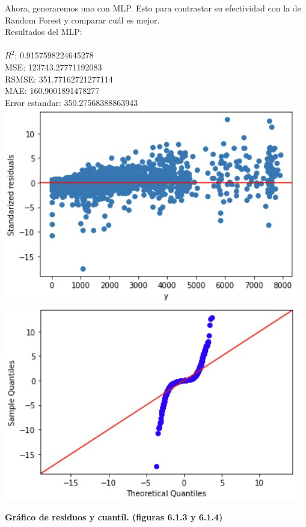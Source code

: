 \documentclass{article}
\begin{document}
            Ahora, generaremos uno con MLP. Esto para contrastar su efectividad con la de Random Forest y comparar cuál es mejor.\\
            
            Resultados del MLP:\\
                    \\  
                        $R^2$:  0.9157598224645278 \\
                        MSE:  123743.27771192083 \\
                        RSMSE:  351.77162721277114 \\
                        MAE:  160.9001891478277 \\
                        Error estandar:  350.27568388863943 \\
                
                
                        \includegraphics[scale=0.6]{images/MLP_After_DS.jpg} 
                        \includegraphics[scale=0.6]{images/MLP_After_DS_Q.jpg} \\
                        \begin{center}
                            \textbf{Gráfico de residuos y cuantíl. (figuras 6.1.3 y 6.1.4)}
                        \end{center}
                        
\end{document}
